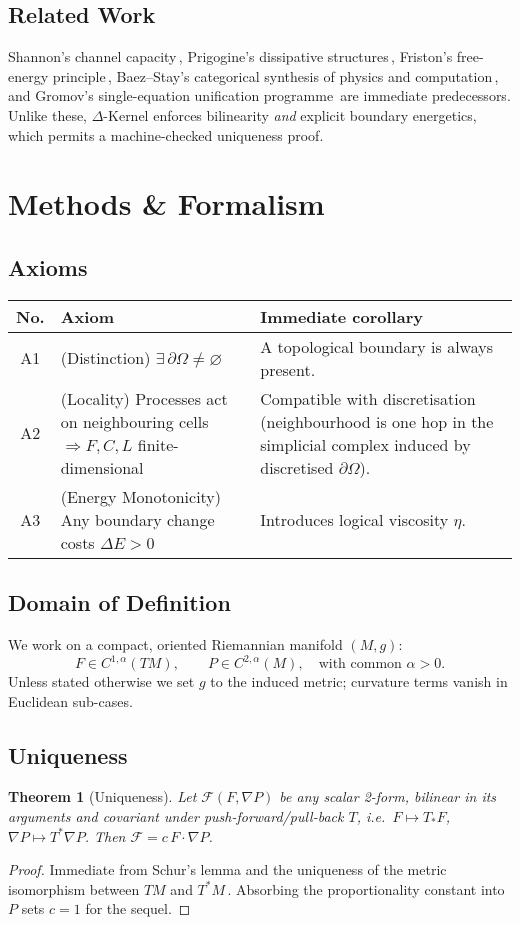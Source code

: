 \documentclass{article}
\newtheorem{theorem}{Theorem}
\begin{document}
\subsection{Related Work}
Shannon's channel capacity\,\cite{shannon1948}, Prigogine's dissipative structures\,\cite{prigogine1980}, Friston's free-energy principle\,\cite{friston2010}, Baez--Stay's categorical synthesis of physics and computation\,\cite{baezstay}, and Gromov's single-equation unification programme\,\cite{gromov2010} are immediate predecessors.  Unlike these, $\Delta$-Kernel enforces bilinearity \emph{and} explicit boundary energetics, which permits a machine-checked uniqueness proof.

\section{Methods \& Formalism}
\subsection{Axioms}
\begin{table}[h]
\centering
\begin{tabular}{clp{7cm}}
\hline
No. & Axiom & Immediate corollary \\
\hline
A1 & (Distinction) $\exists\,\partial\Omega \neq \varnothing$ & A topological boundary is always present. \\
A2 & (Locality) Processes act on neighbouring cells $\Rightarrow F,C,L$ finite-dimensional & Compatible with discretisation (neighbourhood is one hop in the simplicial complex induced by discretised $\partial\Omega$). \\
A3 & (Energy Monotonicity) Any boundary change costs $\Delta E>0$ & Introduces logical viscosity $\eta$. \\
\hline
\end{tabular}
\end{table}

\subsection{Domain of Definition}
We work on a compact, oriented Riemannian manifold $(M,g)$:
\[F\in C^{1,\alpha}(TM), \qquad P\in C^{2,\alpha}(M), \quad \text{with common } \alpha>0.\]
Unless stated otherwise we set $g$ to the induced metric; curvature terms vanish in Euclidean sub-cases.

\subsection{Uniqueness}
\begin{theorem}[Uniqueness]\label{thm:uniq}
Let $\mathcal F(F,\nabla P)$ be any scalar 2-form, bilinear in its arguments and covariant under push-forward/pull-back $T$, i.e.~$F\mapsto T_*F$, $\nabla P\mapsto T^*\nabla P$. Then $\mathcal F = c\,F\!\cdot\!\nabla P$.
\end{theorem}
\begin{proof}
Immediate from Schur's lemma and the uniqueness of the metric isomorphism between $TM$ and $T^*M$\,\cite{fultonharris}.  Absorbing the proportionality constant into $P$ sets $c=1$ for the sequel.
\end{proof}
\end{document}
